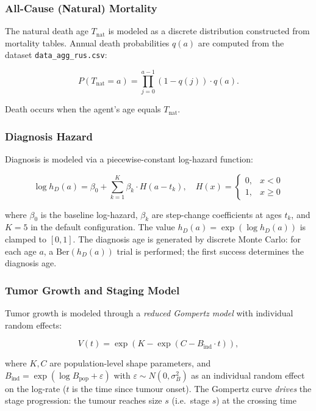 \documentclass[12pt,a4paper]{article}
\begin{document}
\subsubsection{All-Cause (Natural) Mortality}

The natural death age $T_{\text{nat}}$ is modeled as a discrete distribution constructed from mortality tables. Annual death probabilities $q(a)$ are computed from the dataset \texttt{data\_agg\_rus.csv}:

\begin{equation}
    P(T_{\text{nat}} = a) = \prod_{j=0}^{a-1} (1 - q(j)) \cdot q(a).
\end{equation}

Death occurs when the agent's age equals $T_{\text{nat}}$.

\subsubsection{Diagnosis Hazard}

Diagnosis is modeled via a piecewise-constant log-hazard function:

\begin{equation}
    \log h_D(a) = \beta_0 + \sum_{k=1}^{K} \beta_k \cdot H(a - t_k), \quad H(x) = \begin{cases} 0, & x < 0 \\ 1, & x \ge 0 \end{cases}
\end{equation}

where $\beta_0$ is the baseline log-hazard, $\beta_k$ are step-change coefficients at ages $t_k$, and $K=5$ in the default configuration. The value $h_D(a) = \exp(\log h_D(a))$ is clamped to $[0, 1]$. The diagnosis age is generated by discrete Monte Carlo: for each age $a$, a $\text{Ber}(h_D(a))$ trial is performed; the first success determines the diagnosis age.

\subsubsection{Tumor Growth and Staging Model}

Tumor growth is modeled through a \textit{reduced Gompertz model} with individual random effects:

\begin{equation}
    V(t) = \exp\left( K - \exp\left( C - B_{\text{ind}} \cdot t \right) \right),
\end{equation}

where $K, C$ are population-level shape parameters, and $B_{\text{ind}} = \exp(\log B_{\text{pop}} + \varepsilon)$ with $\varepsilon \sim N(0, \sigma_B^2)$ as an individual random effect on the log-rate ($t$ is the time since tumour onset). The Gompertz curve \emph{drives} the stage progression: the tumour reaches size $s$ (i.e.\ stage $s$) at the crossing time
\end{document}
